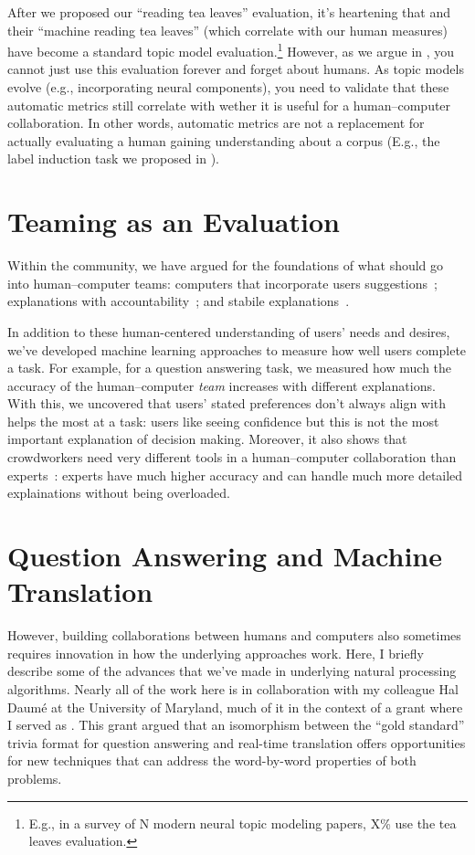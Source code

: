 After we proposed our ``reading tea leaves'' evaluation, it's heartening that  and their ``machine reading tea leaves''
(which correlate with our human measures) have become a standard topic
model evaluation.\footnote{E.g., in a survey of N modern neural topic
  modeling papers, X\% use the tea leaves evaluation.}
%
However, as we argue in , you cannot just use this
evaluation forever and forget about humans.
%
As topic models evolve (e.g., incorporating
neural components), you need to validate that these automatic metrics
still correlate with wether it is useful for a human--computer
collaboration.
%
In other words, automatic metrics are not a replacement for actually
evaluating a human gaining understanding about a corpus (E.g., the
label induction task we proposed in ).

\section{Teaming as an Evaluation}

Within the  community, we have argued for the foundations of
what should go into human--computer teams: computers that incorporate
users suggestions~\cite{kumar-19}; explanations with
accountability~\cite{smith-20}; and stabile
explanations~\cite{smith-20:adherence}.

In addition to these human-centered understanding of users' needs and
desires, we've developed machine learning approaches to measure how
well users complete a task.
%
For example, for a question answering task, we measured how much the
accuracy of the human--computer \emph{team} increases with different
explanations.
%
With this, we uncovered that users' stated preferences don't always
align with helps the most at a task: users like seeing confidence but
this is not the most important explanation of  decision
making.
%
Moreover, it also shows that crowdworkers need very different tools in
a human--computer collaboration than experts~\cite{feng-19}: experts have much higher
accuracy and can handle much more detailed explainations without being
overloaded.

\section{Question Answering and Machine Translation}

However, building collaborations between humans and computers also
sometimes requires innovation in how the underlying approaches work.
%
Here, I briefly describe some of the advances that we've made in 
underlying natural processing algorithms.
%
Nearly all of the work here is in collaboration with my colleague Hal Daum\'e at the University of Maryland, much of it in the context of a  grant where I served as .
%
This grant  argued that an  isomorphism between the  ``gold standard''
trivia format for question  answering and real-time translation offers
opportunities  for  new    techniques  that  can  address  the
word-by-word properties of both problems.

